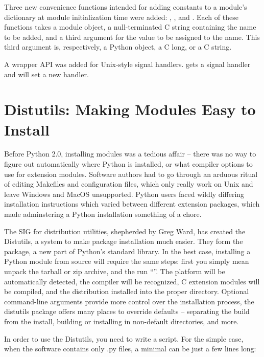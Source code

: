 \documentclass{howto}
\begin{document}
Three new convenience functions intended for adding constants to a
module's dictionary at module initialization time were added:
, ,
and .  Each of these functions
takes a module object, a null-terminated C string containing the name
to be added, and a third argument for the value to be assigned to the
name.  This third argument is, respectively, a Python object, a C
long, or a C string.

A wrapper API was added for Unix-style signal handlers.
 gets a signal handler and
 will set a new handler.

\section{Distutils: Making Modules Easy to Install}

Before Python 2.0, installing modules was a tedious affair -- there
was no way to figure out automatically where Python is installed, or
what compiler options to use for extension modules.  Software authors
had to go through an arduous ritual of editing Makefiles and
configuration files, which only really work on Unix and leave Windows
and MacOS unsupported.  Python users faced wildly differing
installation instructions which varied between different extension
packages, which made adminstering a Python installation something of a
chore.

The SIG for distribution utilities, shepherded by Greg Ward, has
created the Distutils, a system to make package installation much
easier.  They form the  package, a new part of
Python's standard library. In the best case, installing a Python
module from source will require the same steps: first you simply mean
unpack the tarball or zip archive, and the run ``''.  The platform will be automatically detected, the compiler
will be recognized, C extension modules will be compiled, and the
distribution installed into the proper directory.  Optional
command-line arguments provide more control over the installation
process, the distutils package offers many places to override defaults
-- separating the build from the install, building or installing in
non-default directories, and more.

In order to use the Distutils, you need to write a 
script.  For the simple case, when the software contains only .py
files, a minimal  can be just a few lines long:
\end{document}
